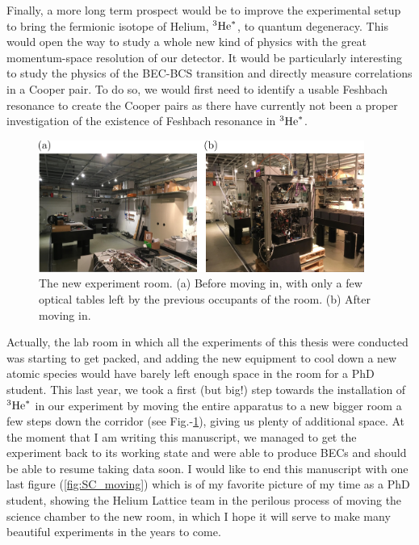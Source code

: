 Finally, a more long term prospect would be to improve the experimental setup to bring the fermionic isotope of Helium, $^3\mathrm{He}^*$, to quantum degeneracy. This would open the way to study a whole new kind of physics with the great momentum-space resolution of our detector. It would be particularly interesting to study the physics of the BEC-BCS transition and directly measure \kmk correlations in a Cooper pair. To do so, we would first need to identify a usable Feshbach resonance to create the Cooper pairs as there have currently not been a proper investigation of the existence of Feshbach resonance in $^3\mathrm{He}^*$. 

\renewcommand{\thefigure}{1}
\begin{figure}[h!]
    \centering
    \includegraphics[width=0.95\textwidth]{Fig/Conclusion/before_after.png}
    \caption[The new experiment room]{The new experiment room. (a) Before moving in, with only a few optical tables left by the previous occupants of the room. (b) After moving in.}
    \label{fig:before_after}
\end{figure}

Actually, the lab room in which all the experiments of this thesis were conducted was starting to get packed, and adding the new equipment to cool down a new atomic species would have barely left enough space in the room for a PhD student. This last year, we took a first (but big!) step towards the installation of $^3\mathrm{He}^*$ in our experiment by moving the entire apparatus to a new bigger room a few steps down the corridor (see Fig.-\ref{fig:before_after}), giving us plenty of additional space. At the moment that I am writing this manuscript, we managed to get the experiment back to its working state and were able to produce BECs and should be able to resume taking data soon. I would like to end this manuscript with one last figure (\ref{fig:SC_moving}) which is of my favorite picture of my time as a PhD student, showing the Helium Lattice team in the perilous process of moving the science chamber to the new room, in which I hope it will serve to make many beautiful experiments in the years to come.




